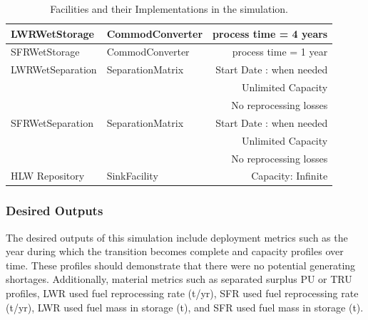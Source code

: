 \begin{table}
\begin{tabular}{|l|l|r|}
\hline
LWRWetStorage & CommodConverter & process time = 4 years\\
\hline
SFRWetStorage & CommodConverter & process time = 1 year \\
\hline
LWRWetSeparation & SeparationMatrix & Start Date : when needed\\
& & Unlimited Capacity\\
& & No reprocessing losses\\
\hline
SFRWetSeparation & SeparationMatrix & Start Date : when needed\\
& & Unlimited Capacity\\
& & No reprocessing losses\\
\hline
HLW Repository & SinkFacility & Capacity: Infinite \\
\hline
\end{tabular}
\caption{Facilities and their Implementations in the simulation.}
\label{tab:facimpl}
\end{table}
\twocolumn


\subsubsection{Desired Outputs}

The desired outputs of this simulation include deployment metrics such as the 
year during which the transition becomes complete and capacity profiles over 
time. These profiles should demonstrate that there were no potential generating 
shortages. Additionally, material metrics such as separated surplus PU or TRU 
profiles, LWR used fuel reprocessing rate (t/yr), SFR used fuel reprocessing 
rate (t/yr),  LWR used fuel mass in storage (t), and SFR used fuel mass in 
storage (t).

